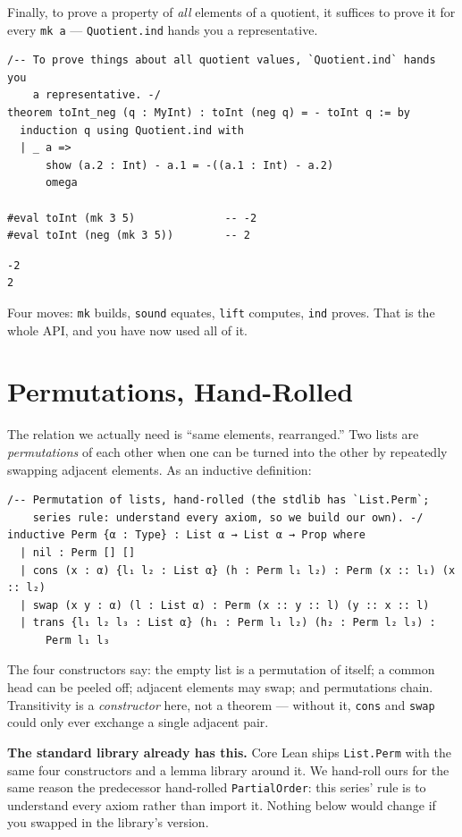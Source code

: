 \documentclass[12pt, a4paper, openright]{book}
\theoremstyle{thmstyle}
\theoremstyle{defstyle}
\newcommand{\lc}[1]{\texttt{#1}}
\newenvironment{notebox}{%
  \begin{tcolorbox}[notebox]%
}{\end{tcolorbox}}
\begin{document}
Finally, to prove a property of \emph{all} elements of a quotient, it
suffices to prove it for every \lc{mk a} --- \lc{Quotient.ind} hands you a
representative.

\begin{verbatim}
/-- To prove things about all quotient values, `Quotient.ind` hands you
    a representative. -/
theorem toInt_neg (q : MyInt) : toInt (neg q) = - toInt q := by
  induction q using Quotient.ind with
  | _ a =>
      show (a.2 : Int) - a.1 = -((a.1 : Int) - a.2)
      omega

#eval toInt (mk 3 5)              -- -2
#eval toInt (neg (mk 3 5))        -- 2
\end{verbatim}

\begin{verbatim}
-2
2
\end{verbatim}

Four moves: \lc{mk} builds, \lc{sound} equates, \lc{lift} computes,
\lc{ind} proves. That is the whole API, and you have now used all of it.

\section{Permutations, Hand-Rolled}

The relation we actually need is ``same elements, rearranged.'' Two lists
are \emph{permutations} of each other when one can be turned into the
other by repeatedly swapping adjacent elements. As an inductive
definition:

\begin{verbatim}
/-- Permutation of lists, hand-rolled (the stdlib has `List.Perm`;
    series rule: understand every axiom, so we build our own). -/
inductive Perm {α : Type} : List α → List α → Prop where
  | nil : Perm [] []
  | cons (x : α) {l₁ l₂ : List α} (h : Perm l₁ l₂) : Perm (x :: l₁) (x :: l₂)
  | swap (x y : α) (l : List α) : Perm (x :: y :: l) (y :: x :: l)
  | trans {l₁ l₂ l₃ : List α} (h₁ : Perm l₁ l₂) (h₂ : Perm l₂ l₃) :
      Perm l₁ l₃
\end{verbatim}

The four constructors say: the empty list is a permutation of itself; a
common head can be peeled off; adjacent elements may swap; and
permutations chain. Transitivity is a \emph{constructor} here, not a
theorem --- without it, \lc{cons} and \lc{swap} could only ever exchange
a single adjacent pair.

\begin{notebox}
  \textbf{The standard library already has this.} Core Lean ships
  \lc{List.Perm} with the same four constructors and a lemma library
  around it. We hand-roll ours for the same reason the predecessor
  hand-rolled \lc{PartialOrder}: this series' rule is to understand every
  axiom rather than import it. Nothing below would change if you swapped
  in the library's version.
\end{notebox}
\end{document}
